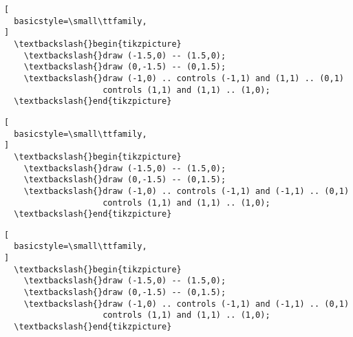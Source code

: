 \documentclass{article}
\begin{document}
\begin{lstlisting}[
  basicstyle=\small\ttfamily,
]
  \textbackslash{}begin{tikzpicture}
    \textbackslash{}draw (-1.5,0) -- (1.5,0);
    \textbackslash{}draw (0,-1.5) -- (0,1.5);
    \textbackslash{}draw (-1,0) .. controls (-1,1) and (1,1) .. (0,1)
                    controls (1,1) and (1,1) .. (1,0);
  \textbackslash{}end{tikzpicture}
\end{lstlisting}

\vspace{1em}


\begin{lstlisting}[
  basicstyle=\small\ttfamily,
]
  \textbackslash{}begin{tikzpicture}
    \textbackslash{}draw (-1.5,0) -- (1.5,0);
    \textbackslash{}draw (0,-1.5) -- (0,1.5);
    \textbackslash{}draw (-1,0) .. controls (-1,1) and (-1,1) .. (0,1)
                    controls (1,1) and (1,1) .. (1,0);
  \textbackslash{}end{tikzpicture}
\end{lstlisting}

\vspace{1em}


\begin{lstlisting}[
  basicstyle=\small\ttfamily,
]
  \textbackslash{}begin{tikzpicture}
    \textbackslash{}draw (-1.5,0) -- (1.5,0);
    \textbackslash{}draw (0,-1.5) -- (0,1.5);
    \textbackslash{}draw (-1,0) .. controls (-1,1) and (-1,1) .. (0,1)
                    controls (1,1) and (1,1) .. (1,0);
  \textbackslash{}end{tikzpicture}
\end{lstlisting}

\vspace{1em}
\end{document}
